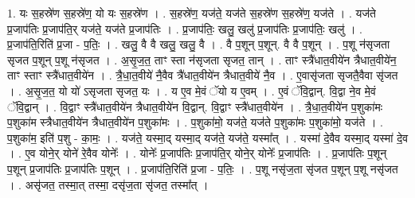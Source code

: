 \documentclass[17pt]{extarticle}
\begin{document}
1. यः स॒हस्रे॑ण स॒हस्रे॑ण॒ यो यः स॒हस्रे॑ण । . स॒हस्रे॑ण॒ यज॑ते॒ यज॑ते स॒हस्रे॑ण स॒हस्रे॑ण॒ यज॑ते । . यज॑ते प्र॒जाप॑तिः प्र॒जाप॑ति॒र् यज॑ते॒ यज॑ते प्र॒जाप॑तिः । . प्र॒जाप॑तिः॒ खलु॒ खलु॑ प्र॒जाप॑तिः प्र॒जाप॑तिः॒ खलु॑ । . प्र॒जाप॑ति॒रिति॑ प्र॒जा - प॒तिः॒ । . खलु॒ वै वै खलु॒ खलु॒ वै । . वै प॒शून् प॒शून्. वै वै प॒शून् । . प॒शू न॑सृजता सृजत प॒शून् प॒शू न॑सृजत । . अ॒सृ॒ज॒त॒ ताꣳ स्ता न॑सृजता सृजत॒ तान् । . ताꣳ स्त्रै॑धात॒वीये॑न त्रैधात॒वीये॑न॒ ताꣳ स्ताꣳ स्त्रै॑धात॒वीये॑न । . त्रै॒धा॒त॒वीये॑ नै॒वैव त्रै॑धात॒वीये॑न त्रैधात॒वीये॑ नै॒व । . ए॒वासृ॑जता सृजतै॒वैवा सृ॑जत । . अ॒सृ॒ज॒त॒ यो यो॑ ऽसृजता सृजत॒ यः । . य ए॒व मे॒वं ॅयो य ए॒वम् । . ए॒वं ॅवि॒द्वान्. वि॒द्वा ने॒व मे॒वं ॅवि॒द्वान् । . वि॒द्वाꣳ स्त्रै॑धात॒वीये॑न त्रैधात॒वीये॑न वि॒द्वान्. वि॒द्वाꣳ स्त्रै॑धात॒वीये॑न । . त्रै॒धा॒त॒वीये॑न प॒शुका॑मः प॒शुका॑म स्त्रैधात॒वीये॑न त्रैधात॒वीये॑न प॒शुका॑मः । . प॒शुका॑मो॒ यज॑ते॒ यज॑ते प॒शुका॑मः प॒शुका॑मो॒ यज॑ते । . प॒शुका॑म॒ इति॑ प॒शु - का॒मः॒ । . यज॑ते॒ यस्मा॒द् यस्मा॒द् यज॑ते॒ यज॑ते॒ यस्मा᳚त् । . यस्मा॑ दे॒वैव यस्मा॒द् यस्मा॑ दे॒व । . ए॒व योने॒र् योने॑ रे॒वैव योनेः᳚ । . योनेः᳚ प्र॒जाप॑तिः प्र॒जाप॑ति॒र् योने॒र् योनेः᳚ प्र॒जाप॑तिः । . प्र॒जाप॑तिः प॒शून् प॒शून् प्र॒जाप॑तिः प्र॒जाप॑तिः प॒शून् । . प्र॒जाप॑ति॒रिति॑ प्र॒जा - प॒तिः॒ । . प॒शू नसृ॑ज॒ता सृ॑जत प॒शून् प॒शू नसृ॑जत । . असृ॑जत॒ तस्मा॒त् तस्मा॒ दसृ॑ज॒ता सृ॑जत॒ तस्मा᳚त् । \newline
\end{document}
